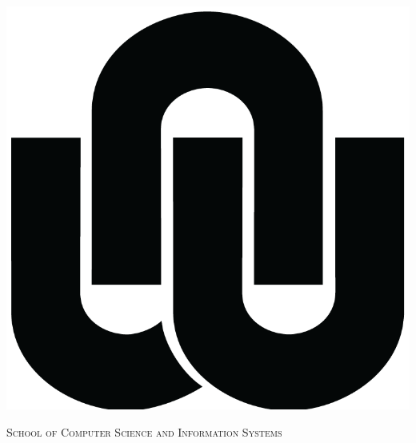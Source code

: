 \documentclass[
12pt, %
oneside, %
english, %
onehalfspacing, %
headsepline, %
]{MastersDoctoralThesis} %
\author{Joshua \textsc{Esterhuizen}} %
\begin{document}
\frontmatter %

\pagestyle{plain} %


\begin{titlepage}
\begin{center}
\includegraphics[scale=0.4]{Figures/nwu.png}\\[.4cm]

{\scshape\LARGE \univname\par}\vspace{0.5cm} %
\textsc{\Large School of Computer Science and Information Systems}\\[0.5cm] %

\HRule \\[0.4cm] %
{\huge \bfseries \ttitle\par}\vspace{0.4cm} %
\HRule \\[1.0cm] %
 

\end{center}
\end{titlepage}
\end{document}
